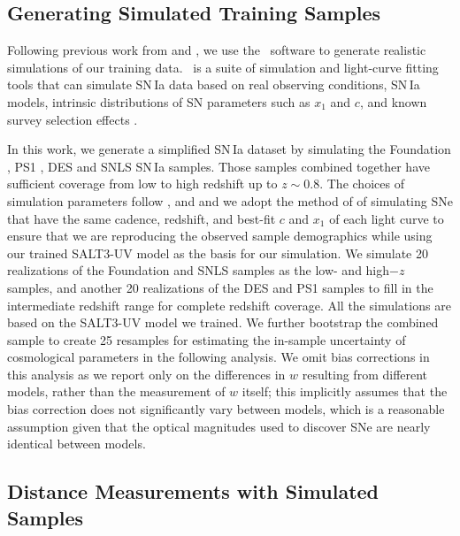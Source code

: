 \documentclass[twocolumn,tighten,times,floatfix]{aastex631}
\newcommand{\snana}{{\fontfamily{qcr}\selectfont{SNANA}}}
\begin{document}
\subsection{Generating Simulated Training Samples}

Following previous work from \citet{kenworthy_salt3_2021} and \citet{Pierel_salt3nir_2022}, we use the \snana\  software \citep{snana} to generate realistic simulations of our training data. \snana\  is a suite of simulation and light-curve fitting tools that can simulate SN\,Ia data based on real observing conditions, SN\,Ia models, intrinsic distributions of SN parameters such as $x_1$ and $c$, and known survey selection effects \citep{snana}.

In this work, we generate a simplified SN\,Ia dataset by simulating the Foundation \citep{Foley18, Jones19}, PS1 \citep{Scolnic18}, DES \citep{Kessler19, Abbott19} and SNLS \citep{Astier06} SN\,Ia samples. Those samples combined together have sufficient coverage from low to high redshift up to $z \sim 0.8$.  
The choices of simulation parameters follow \citet{Scolnic19}, \citet{Kessler19} and \citet{Jones19} and we adopt the method of \citet{kenworthy_salt3_2021} of simulating SNe that have the same cadence, redshift, and best-fit $c$ and $x_1$ of each light curve to ensure that we are reproducing the observed sample demographics while using our trained SALT3-UV model as the basis for our simulation. We simulate 20 realizations of the Foundation and SNLS samples as the low- and high$-z$ samples, and another 20 realizations of the DES and PS1 samples to fill in the intermediate redshift range for complete redshift coverage. All the simulations are based on the SALT3-UV model we trained. We further bootstrap the combined sample to create 25 resamples for estimating the in-sample uncertainty of cosmological parameters in the following analysis.  We omit bias corrections in this analysis as we report only on the differences in $w$ resulting from different models, rather than the measurement of $w$ itself; this implicitly assumes that the bias correction does not significantly vary between models, which is a reasonable assumption given that the optical magnitudes used to discover SNe are nearly identical between models.

\subsection{Distance Measurements with Simulated Samples }
\end{document}
